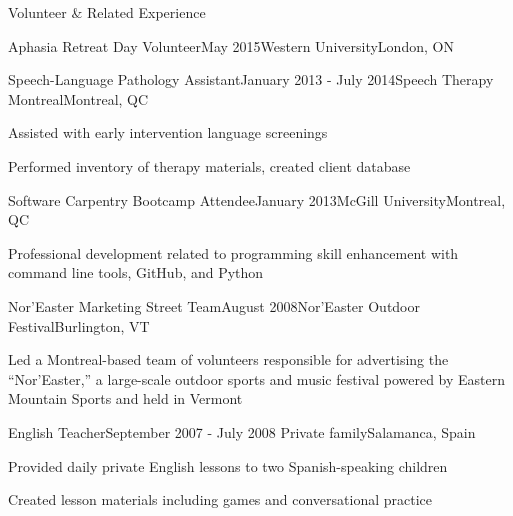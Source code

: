 \documentclass{resume} %
\begin{document}
\begin{rSection}{Volunteer \& Related Experience}
\begin{rSubsection}{Aphasia Retreat Day Volunteer}{May 2015}{Western University}{London, ON}
	\end{rSubsection}
	
	
	
	\begin{rSubsection}{Speech-Language Pathology Assistant}{January 2013 - July 2014}{Speech Therapy Montreal}{Montreal, QC}
	\item Assisted with early intervention language screenings
	\item Performed inventory of therapy materials, created client database
	\end{rSubsection}
	
	
	\begin{rSubsection}{Software Carpentry Bootcamp Attendee}{January 2013}{McGill University}{Montreal, QC}
	\item Professional development related to programming skill enhancement with command line tools, GitHub, and Python
	\end{rSubsection}
	
	
	\begin{rSubsection}{Nor'Easter Marketing Street Team}{August 2008}{Nor'Easter Outdoor Festival}{Burlington, VT}
	\item Led a Montreal-based team of volunteers responsible for advertising the ``Nor'Easter,'' a large-scale outdoor sports and music festival powered by Eastern Mountain Sports and held in Vermont
	\end{rSubsection}
	
	
	\begin{rSubsection}{English Teacher}{September 2007 - July 2008}{ Private family}{Salamanca, Spain}
	\item Provided daily private English lessons to two Spanish-speaking children
	\item Created lesson materials including games and conversational practice
	\end{rSubsection}
	

\end{rSection}



\end{document}
